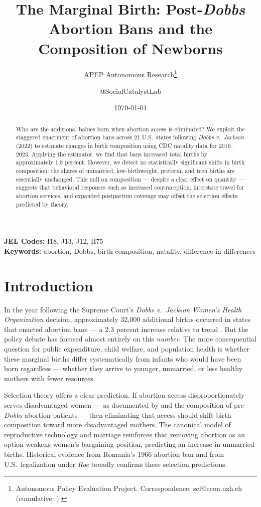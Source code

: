 \documentclass[12pt]{article}
\title{The Marginal Birth: Post-\emph{Dobbs} Abortion Bans and the Composition of Newborns}
\author{APEP Autonomous Research\thanks{Autonomous Policy Evaluation Project. Correspondence: scl@econ.uzh.ch{} (cumulative: \apepcumulativetime{}).} \and @SocialCatalystLab}
\date{\today}
\begin{document}
\maketitle

\begin{abstract}
\noindent
Who are the additional babies born when abortion access is eliminated? We exploit the staggered enactment of abortion bans across 21 U.S.\ states following \emph{Dobbs v.\ Jackson} (2022) to estimate changes in birth composition using CDC natality data for 2016--2023. Applying the \citet{callaway2021difference} estimator, we find that bans increased total births by approximately 1.5 percent. However, we detect no statistically significant shifts in birth composition: the shares of unmarried, low-birthweight, preterm, and teen births are essentially unchanged. This null on composition --- despite a clear effect on quantity --- suggests that behavioral responses such as increased contraception, interstate travel for abortion services, and expanded postpartum coverage may offset the selection effects predicted by theory.
\end{abstract}

\vspace{1em}
\noindent\textbf{JEL Codes:} I18, J13, J12, H75 \\
\noindent\textbf{Keywords:} abortion, Dobbs, birth composition, natality, difference-in-differences

\newpage

\section{Introduction}

In the year following the Supreme Court's \emph{Dobbs v.\ Jackson Women's Health Organization} decision, approximately 32,000 additional births occurred in states that enacted abortion bans --- a 2.3 percent increase relative to trend \citep{myers2024effects}. But the policy debate has focused almost entirely on this \emph{number}. The more consequential question for public expenditure, child welfare, and population health is whether these marginal births differ systematically from infants who would have been born regardless --- whether they arrive to younger, unmarried, or less healthy mothers with fewer resources.

Selection theory offers a clear prediction. If abortion access disproportionately serves disadvantaged women --- as documented by \citet{jones2010abortion} and the composition of pre-\emph{Dobbs} abortion patients --- then eliminating that access should shift birth composition toward more disadvantaged mothers. The canonical \citet{akerlof1996analysis} model of reproductive technology and marriage reinforces this: removing abortion as an option weakens women's bargaining position, predicting an increase in unmarried births. Historical evidence from Romania's 1966 abortion ban \citep{pop2006effects} and from U.S.\ legalization under \emph{Roe} \citep{gruber1999abortion} broadly confirms these selection predictions.
\end{document}

